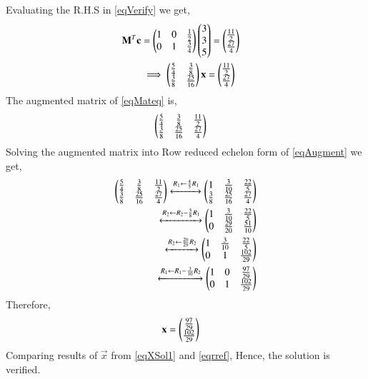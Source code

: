 \documentclass[journal,12pt,twocolumn]{IEEEtran}
\begin{document}
Evaluating the R.H.S in \eqref{eqVerify} we get,
\begin{align}
\mathbf{M}^T\mathbf{c} &= \begin{pmatrix}1&0&\frac{1}{2}\\0&1&\frac{3}{4}\end{pmatrix}\begin{pmatrix}3\\3\\5\end{pmatrix}=\begin{pmatrix}\frac{11}{2}\\\frac{27}{4}\end{pmatrix}\\
&\implies\begin{pmatrix}\frac{5}{4}&\frac{3}{8}\\\frac{3}{8}&\frac{25}{16}\end{pmatrix}\mathbf{x} = \begin{pmatrix}\frac{11}{2}\\\frac{27}{4}\end{pmatrix}&\label{eqMateq}
\end{align}
The augmented matrix of \eqref{eqMateq} is,
\begin{align}
\begin{pmatrix}\frac{5}{4}&\frac{3}{8} &\frac{11}{2}\\\frac{3}{8}&\frac{25}{16}&\frac{27}{4}\end{pmatrix} & \label{eqAugment}
\end{align}
Solving the augmented matrix into Row reduced echelon form of \eqref{eqAugment} we get,
\begin{align}
\begin{pmatrix}\frac{5}{4}&\frac{3}{8} &\frac{11}{2}\\\frac{3}{8}&\frac{25}{16}&\frac{27}{4}\end{pmatrix}\xleftrightarrow[]{R_1\leftarrow\frac{4}{5}R_1}\begin{pmatrix}1&\frac{3}{10}&\frac{22}{5}\\\frac{3}{8}&\frac{25}{16}&\frac{27}{4}\end{pmatrix}\\
\xleftrightarrow[]{R_2\leftarrow R_2-\frac{3}{8}R_1}\begin{pmatrix}1&\frac{3}{10}&\frac{22}{5}\\0&\frac{29}{20}&\frac{51}{10}\end{pmatrix}\\
\xleftrightarrow[]{R_2\leftarrow \frac{20}{29}R_2}\begin{pmatrix}1&\frac{3}{10}&\frac{22}{5}\\0&1&\frac{102}{29}\end{pmatrix}\\
\xleftrightarrow[]{R_1\leftarrow R_1-\frac{3}{10}R_2}\begin{pmatrix}1&0&\frac{97}{29}\\0&1&\frac{102}{29}\end{pmatrix}
\end{align}
Therefore,
\begin{align}
   \mathbf{x}&=\begin{pmatrix}\frac{97}{29}\\\frac{102}{29}\end{pmatrix}\label{eqrref}
\end{align}
Comparing results of $\vec{x}$ from \eqref{eqXSol1} and \eqref{eqrref}, Hence, the solution is verified.
\end{document}
